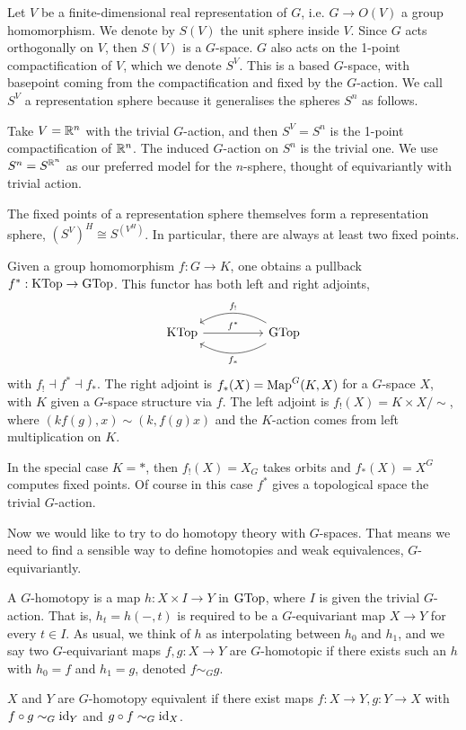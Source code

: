 \begin{example}
    Let $V$ be a finite-dimensional real representation of $G$, i.e. $G \to O(V)$ a group homomorphism. We denote by $S(V)$ the unit sphere inside $V$. Since $G$ acts orthogonally on $V$, then $S(V)$ is a $G$-space. $G$ also acts on the 1-point compactification of $V$, which we denote $S^V$. This is a based $G$-space, with basepoint coming from the compactification and fixed by the $G$-action. We call $S^V$ a representation sphere because it generalises the spheres $S^n$ as follows. 

    Take $V = \mathbb{R}^n$ with the trivial $G$-action, and then $S^V = S^n$ is the 1-point compactification of $\mathbb{R}^n$. The induced $G$-action on $S^n$ is the trivial one. We use $S^n = S^{\mathbb{R}^n}$ as our preferred model for the $n$-sphere, thought of equivariantly with trivial action. 

    The fixed points of a representation sphere themselves form a representation sphere, $(S^V)^H \cong S^{(V^H)}$. In particular, there are always at least two fixed points.
\end{example}

\begin{construction}
    Given a group homomorphism $f: G \to K$, one obtains a pullback $f^*: \operatorname{KTop} \to \operatorname{GTop}$. This functor has both left and right adjoints,
    \[\begin{tikzcd}
        \KTop \arrow[rr, "f^*"] &  & \GTop \arrow[ll, "f_*", bend left] \arrow[ll, "f_!"', bend right]
        \end{tikzcd}\]
    with $f_! \dashv f^* \dashv f_*$. The right adjoint is $f_*(X) = \operatorname{Map}^G(K, X)$ for a $G$-space $X$, with $K$ given a $G$-space structure via $f$. The left adjoint is $f_!(X) = K \times X/ \sim$, where $(kf(g), x) \sim (k, f(g)x)$ and the $K$-action comes from left multiplication on $K$.

    In the special case $K = *$, then $f_!(X) = X_G$ takes orbits and $f_*(X) = X^G$ computes fixed points. Of course in this case $f^*$ gives a topological space the trivial $G$-action.
\end{construction}

Now we would like to try to do homotopy theory with $G$-spaces. That means we need to find a sensible way to define homotopies and weak equivalences, $G$-equivariantly.

\begin{defn}[$G$-homotopy]
    A $G$-homotopy is a map $h: X \times I \to Y$ in $\operatorname{GTop}$, where $I$ is given the trivial $G$-action. That is, $h_t = h(-, t)$ is required to be a $G$-equivariant map $X \to Y$ for every $t \in I$. As usual, we think of $h$ as interpolating between $h_0$ and $h_1$, and we say two $G$-equivariant maps $f, g: X \to Y$ are $G$-homotopic if there exists such an $h$ with $h_0 = f$ and $h_1 = g$, denoted $f \sim_G g$. 

    $X$ and $Y$ are $G$-homotopy equivalent if there exist maps $f: X \to Y, g: Y \to X$ with $f \circ g \sim_G \operatorname{id}_Y$ and $g \circ f \sim_G \operatorname{id}_X$.
\end{defn}

